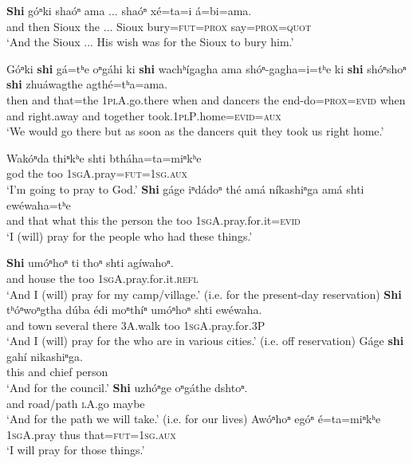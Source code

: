 \documentclass[output=paper]{LSP/langsci}
\begin{document}
\ex\label{ex:rudin:9} 
\gll  \textbf{Shi}  góⁿki 	shaóⁿ 	ama ... shaóⁿ  	xé=ta=i  á=bi=ama.\\          
    	and  	then 	Sioux 	the 	 ... Sioux  	bury=\textsc{fut=prox} 	say=\textsc{prox=quot}\\
\trans `And the Sioux ...  His wish was for the Sioux to bury him.'

\ex\label{ex:rudin:10} 
\gll  Góⁿki 	\textbf{shi} 	gá=tʰe  oⁿgáhi  ki    \textbf{shi} 	wachʰígagha ama  shóⁿ-gagha=i=tʰe 	ki 	\textbf{shi} 	shóⁿshoⁿ    \textbf{shi} 	zhuáwagthe 	agthé=tʰa=ama.\\
    	then 	and that=the \textsc{1plA}.go.there when 	and dancers the end-do=\textsc{prox=evid} when 	and right.away and 	together 	took.\textsc{1plP}.home=\textsc{evid=aux}\\
\trans `We would go there but as soon as the dancers quit they took us right home.'
\z 

\ea                 \label{ex:rudin:11}
\ea
\gll  Wakóⁿda 	thiⁿkʰe 	shti  	btháha=ta=miⁿkʰe\\
	god          	the       	too  	\textsc{1sgA}.pray=\textsc{fut=1sg.aux}\\
\trans `I'm going to pray to God.'
\ex 
\gll	\textbf{Shi} gáge 	iⁿdádoⁿ thé 	amá 	níkashiⁿga 	amá 	shti ewéwaha=tʰe\\
and 	that   what     	this 	the 	person    	the 	too 	\textsc{1sgA}.pray.for.it=\textsc{evid}\\
\trans `I (will) pray for the people who had these things.'

\ex 
\gll	\textbf{Shi}  umóⁿhoⁿ 	ti    	thoⁿ 	shti 	agíwahoⁿ.\\
and 	  	house 	the 	too 	\textsc{1sgA}.pray.for.it.\textsc{refl}\\
\trans `And I (will) pray for my  camp/village.'  (i.e. for the present-day reservation)
\ex 
\gll	\textbf{Shi} tʰóⁿwoⁿgtha dúba  édi moⁿthíⁿ umóⁿhoⁿ shti ewéwaha. \\         
and town several there 3A.walk   	too 	\textsc{1sgA}.pray.for.3P\\
\trans `And I (will) pray for the  who are in various cities.'  (i.e. off reservation)
\ex 
\gll	Gáge \textbf{shi} 	gahí 	nikashiⁿga.\\
	this 	and 	chief  	person\\
\trans `And for the council.'
\ex 
\gll	\textbf{Shi} uzhóⁿge  	oⁿgáthe 	dshtoⁿ.\\
	and  	road/path 	\textsc{lA}.go  	maybe\\
\trans `And for the path we will take.'  (i.e. for our lives)
\ex 
\gll	Awóⁿhoⁿ 	egóⁿ  	é=ta=miⁿkʰe\\
	\textsc{1sgA}.pray 	thus 	that=\textsc{fut=1sg.aux}\\
\trans `I will pray for those things.' 
\z
\z
\end{document}
